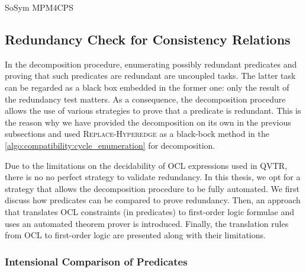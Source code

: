 \begin{copiedFrom}{SoSym MPM4CPS}

\subsection{Redundancy Check for Consistency Relations}
\label{chap:compatibility:practical_approach:redundancies}

In the decomposition procedure, enumerating possibly redundant predicates and proving that such predicates are redundant are uncoupled tasks. 
The latter task can be regarded as a black box embedded in the former one: only the result of the redundancy test matters. As a consequence, the decomposition procedure allows the use of various strategies to prove that a predicate is redundant. 
This is the reason why we have provided the decomposition on its own in the previous subsections and used \textsc{Replace-Hyperedge} as a black-bock method in the \autoref{algo:compatibility:cycle_enumeration} for decomposition. %

Due to the limitations on the decidability of OCL expressions used in \gls{QVTR}, there is no no perfect strategy to validate redundancy. In this thesis, we opt for a strategy that allows the decomposition procedure to be fully automated. We first discuss how predicates can be compared to prove redundancy. Then, an approach that translates OCL constraints (in predicates) to first-order logic formulae and uses an automated theorem prover is introduced. Finally, the translation rules from OCL to first-order logic are presented along with their limitations.

\subsubsection{Intensional Comparison of Predicates}


\end{copiedFrom}
